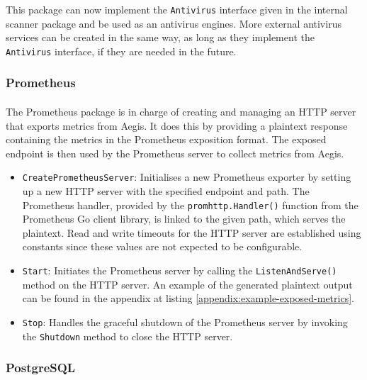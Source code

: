 \documentclass[12pt, conference, final, a4paper, onecolumn, compsoc]{IEEEtran}
\begin{document}
This package can now implement the \texttt{Antivirus} interface given in the
internal scanner package and be used as an antivirus engines. More external
antivirus services can be created in the same way, as long as they implement the
\texttt{Antivirus} interface, if they are needed in the future.

\subsubsection*{Prometheus}
\paragraph{}

The Prometheus package is in charge of creating and managing an HTTP server that
exports metrics from Aegis. It does this by providing a plaintext response
containing the metrics in the Prometheus exposition format. The exposed endpoint
is then used by the Prometheus server to collect metrics from Aegis.

\begin{itemize}
  \item \texttt{CreatePrometheusServer}: Initialises a new Prometheus exporter
        by setting up a new HTTP server with the specified endpoint and path.
        The Prometheus handler, provided by the \texttt{promhttp.Handler()}
        function from the Prometheus Go client library, is linked to the given
        path, which serves the plaintext. Read and write timeouts for the HTTP
        server are established using constants since these values are not
        expected to be configurable.
  \item \texttt{Start}: Initiates the Prometheus server by calling the
        \texttt{ListenAndServe()} method on the HTTP server. An example of the
        generated plaintext output can be found in the appendix at listing
        \ref{appendix:example-exposed-metrics}.
  \item \texttt{Stop}: Handles the graceful shutdown of the Prometheus server by
        invoking the \texttt{Shutdown} method to close the HTTP server.
\end{itemize}

\subsubsection*{PostgreSQL}
\paragraph{}
\end{document}
